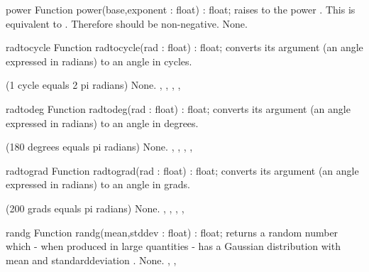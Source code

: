 

\begin{function}{power}
\Declaration
Function power(base,exponent : float) : float;
\Description
{} raises  to the power . This is equivalent
to . Therefore  should be non-negative.
\Errors
None.
\SeeAlso
{}
\end{function}



\begin{function}{radtocycle}
\Declaration
Function radtocycle(rad : float) : float;
\Description
{} converts its argument  (an angle expressed in
radians) to an angle in cycles.

(1 cycle equals 2 pi radians)
\Errors
None.
\SeeAlso
{}, , ,
, 
\end{function}



\begin{function}{radtodeg}
\Declaration
Function radtodeg(rad : float) : float;
\Description
{} converts its argument  (an angle expressed in
radians) to an angle in degrees.

(180 degrees equals pi radians)
\Errors
None.
\SeeAlso
{}, , ,
, 
\end{function}



\begin{function}{radtograd}
\Declaration
Function radtograd(rad : float) : float;
\Description
{} converts its argument  (an angle expressed in
radians) to an angle in grads.

(200 grads equals pi radians)
\Errors
None.
\SeeAlso
{}, , ,
, 
\end{function}



\begin{function}{randg}
\Declaration
Function randg(mean,stddev : float) : float;
\Description
{} returns a random number which - when produced in large
quantities - has a Gaussian distribution with mean  and 
standarddeviation . 
\Errors
None.
\SeeAlso
{}, , 
\end{function}

